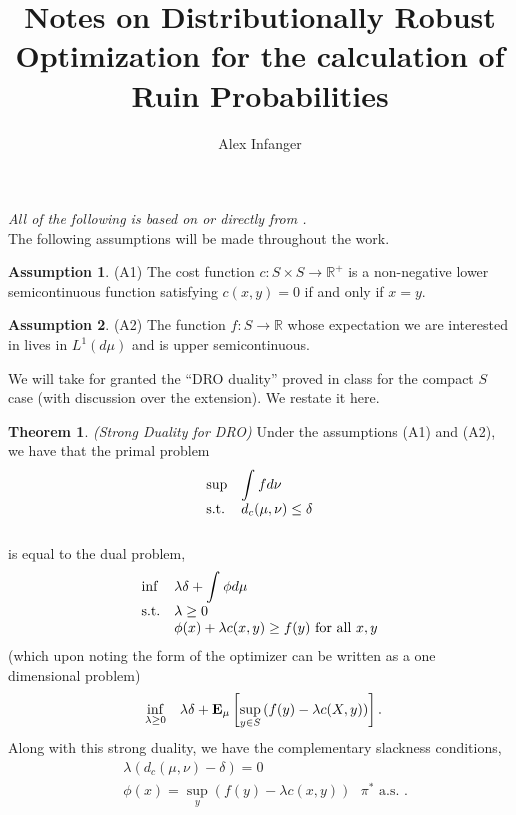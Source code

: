 \documentclass[12pt]{article}
\newcommand{\R}{\mathbb{R}}
\newcommand{\E}{\textbf{E}}
\theoremstyle{definition}
\newtheorem{theorem}{Theorem}
\theoremstyle{definition}
\newtheorem{assumption}{Assumption}
\theoremstyle{definition}
\begin{document}
\title{Notes on Distributionally Robust Optimization for the calculation of Ruin Probabilities}
\author{Alex Infanger}
\maketitle
\emph{All of the following is based on or directly from \cite{JosePaper}.}\\

The following assumptions will be made throughout the work.
\begin{assumption} (A1) The cost function $c:S\times S\rightarrow\R^+$ is a non-negative lower semicontinuous function satisfying $c(x,y)=0$ if and only if $x=y$.
\end{assumption}
\begin{assumption} (A2) The function $f:S\rightarrow\R$ whose expectation we are interested in lives in $L^1(d\mu)$ and is upper semicontinuous.
\end{assumption}

We will take for granted the ``DRO duality'' proved in class for the compact $S$ case (with discussion over the extension). We restate it here.

\begin{theorem} \emph{(Strong Duality for DRO)} \label{strong_duality} Under the assumptions (A1) and (A2), we have that the primal problem
\begin{align*}
\begin{array}{ll@{}ll}
\displaystyle \sup   &\displaystyle \int_{}^{}f d\nu &\\
\text{s.t.}&  d_c(\mu,\nu)\leq \delta\\
                 & 
\end{array}
\end{align*}
is equal to the dual problem, 
\begin{align*}
\begin{array}{ll@{}ll}
\displaystyle \inf  &\displaystyle \lambda \delta + \int_{}^{}\phi d\mu &\\
\text{s.t.}& \lambda\geq 0 \\
          & \phi(x)+\lambda c(x,y) \geq f(y) \text{ for all $x,y$}
\end{array}
\end{align*}
(which upon noting the form of the optimizer can be written as a one dimensional problem)
\begin{align*}
\begin{array}{ll@{}ll}
\displaystyle \inf_{\lambda\geq 0}  &\displaystyle \lambda\delta +  \E_{\mu}\left[\sup_{y\in S} \left(f(y)-\lambda c(X,y)\right)\right]. 
\end{array}
\end{align*}
Along with this strong duality, we have the complementary slackness conditions,
\begin{align*}
&\lambda\left(d_c(\mu,\nu)-\delta\right)=0\\
&\phi(x)=\sup_y \left(f(y)-\lambda c(x,y)\right) \text{ $\pi^*$ a.s. .}
\end{align*}
\end{theorem}
\end{document}
